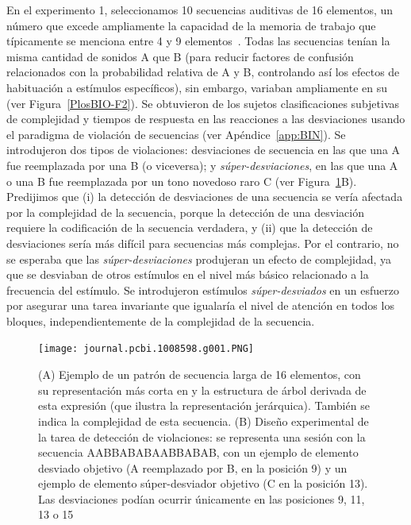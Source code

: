 En el experimento 1, seleccionamos 10 secuencias auditivas de 16 elementos, un número que excede ampliamente la capacidad de la memoria de trabajo que típicamente se menciona entre 4 y 9 elementos~\cite{f25,f29,f86}. Todas las secuencias tenían la misma cantidad de sonidos A que B (para reducir factores de confusión relacionados con la probabilidad relativa de A y B, controlando así los efectos de habituación a estímulos específicos), sin embargo, variaban ampliamente en su \mdlbin (ver Figura~\ref{PlosBIO-F2}). Se obtuvieron de los sujetos clasificaciones subjetivas de complejidad y tiempos de respuesta en las reacciones a las desviaciones usando el paradigma de violación de secuencias (ver Apéndice~\ref{app:BIN}). Se introdujeron dos tipos de violaciones: desviaciones de secuencia en las que una A fue reemplazada por una B (o viceversa); y \textit{súper-desviaciones}, en las que una A o una B fue reemplazada por un tono novedoso raro C (ver Figura~\ref{PlosBIO-F1}B). Predijimos que (i) la detección de desviaciones de una secuencia se vería afectada por la complejidad de la secuencia, porque la detección de una desviación requiere la codificación de la secuencia verdadera, y (ii) que la detección de desviaciones sería más difícil para secuencias más complejas. Por el contrario, no se esperaba que las \textit{súper-desviaciones} produjeran un efecto de complejidad, ya que se desviaban de otros estímulos en el nivel más básico relacionado a la frecuencia del estímulo. Se introdujeron estímulos \textit{súper-desviados} en un esfuerzo por asegurar una tarea invariante que igualaría el nivel de atención en todos los bloques, independientemente de la complejidad de la secuencia. 

\begin{figure}[t!]
   \texttt{[image: journal.pcbi.1008598.g001.PNG]}
   
   \centering
   
   \caption{(A) Ejemplo de un patrón de secuencia larga de 16 elementos, con su representación más corta en \grambin y la estructura de árbol derivada de esta expresión (que ilustra la representación jerárquica). También se indica la complejidad \mdlbin de esta secuencia. (B) Diseño experimental de la tarea de detección de violaciones: se representa una sesión con la secuencia AABBABABAABBABAB, con un ejemplo de elemento desviado objetivo (A reemplazado por B, en la posición 9) y un ejemplo de elemento súper-desviador objetivo (C en la posición 13). Las desviaciones podían ocurrir únicamente en las posiciones 9, 11, 13 o 15}
   \label{PlosBIO-F1}
\end{figure}

